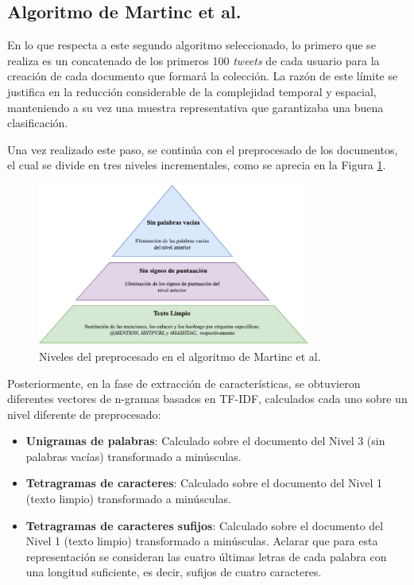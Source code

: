 \subsection{Algoritmo de Martinc et al. \cite{martinc2019hot}}

En lo que respecta a este segundo algoritmo seleccionado, lo primero que se realiza es un concatenado de los primeros 100 \textit{tweets} de cada usuario para la creación de cada documento
que formará la colección. La razón de este límite se justifica en la reducción considerable de la complejidad temporal y espacial, manteniendo a su vez una muestra representativa que garantizaba
una buena clasificación.

\bigskip
Una vez realizado este paso, se continúa con el preprocesado de los documentos, el cual se divide en tres niveles incrementales, como se aprecia en la Figura \ref{fig:preprocesado_martinc}.

\bigskip
\begin{figure}[H]
	\centering
	\includegraphics[width=0.8\textwidth]{diagramas/pyramid-martinc.pdf}
	\caption{Niveles del preprocesado en el algoritmo de Martinc et al. \cite{martinc2019hot}}
	\label{fig:preprocesado_martinc}
\end{figure}

Posteriormente, en la fase de extracción de características, se obtuvieron diferentes vectores de n-gramas basados en TF-IDF, calculados cada uno sobre un nivel diferente de preprocesado:

\bigskip
\begin{itemize}
	\item \textbf{Unigramas de palabras}: Calculado sobre el documento del Nivel 3 (sin palabras vacías) transformado a minúsculas.
	\item \textbf{Tetragramas de caracteres}: Calculado sobre el documento del Nivel 1 (texto limpio) transformado a minúsculas.
	\item \textbf{Tetragramas de caracteres sufijos}: Calculado sobre el documento del Nivel 1 (texto limpio) transformado a minúsculas. Aclarar que para esta representación
	      se consideran las cuatro últimas letras de cada palabra con una longitud suficiente, es decir, sufijos de cuatro caracteres.
\end{itemize}

